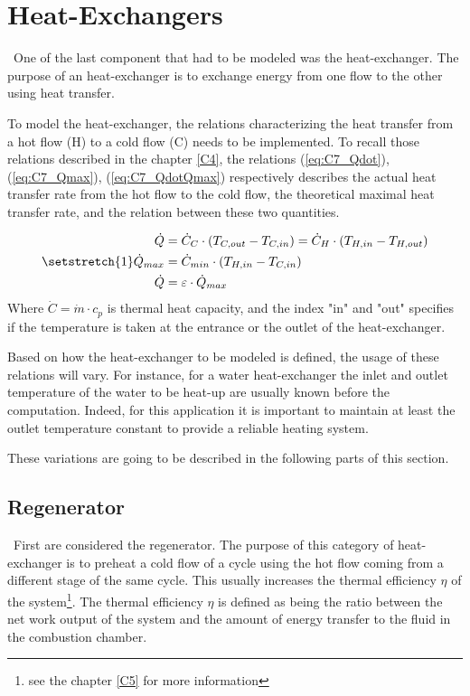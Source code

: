\section{Heat-Exchangers}
\quad\ One of the last component that had to be modeled was the heat-exchanger. The purpose of an heat-exchanger is to exchange energy from one flow to the other using heat transfer. 

To model the heat-exchanger, the relations characterizing the heat transfer from a hot flow (H) to a cold flow (C) needs to be implemented. To recall those relations described in the chapter \ref{C4}, the relations (\ref{eq:C7_Qdot}), (\ref{eq:C7_Qmax}),  (\ref{eq:C7_QdotQmax}) respectively describes the actual heat transfer rate from the hot flow to the cold flow, the theoretical maximal heat transfer rate, and the relation between these two quantities.   

\begin{subequations}
\setstretch{1}
\begin{align}
    \dot{Q} &= \dot{C}_C\cdot (T_{C,out} - T_{C,in}) = \dot{C}_H\cdot(T_{H,in} - T_{H,out})\label{eq:C7_Qdot}\\
    \dot{Q}_{max} &= \dot{C}_{min}\cdot (T_{H,in} - T_{C,in})\label{eq:C7_Qmax}\\
    \dot{Q} &= \varepsilon\cdot\dot{Q}_{max}\label{eq:C7_QdotQmax}
\end{align}
\end{subequations}
Where $\dot{C} = \dot{m}\cdot c_p$ is thermal heat capacity, and the index "in" and "out" specifies if the temperature is taken at the entrance or the outlet of the heat-exchanger. 

Based on how the heat-exchanger to be modeled is defined, the usage of these relations will vary. For instance, for a water heat-exchanger the inlet and outlet temperature of the water to be heat-up are usually known before the computation. Indeed, for this application it is important to maintain at least the outlet temperature constant to provide a reliable heating system. 

These variations are going to be described in the following parts of this section.

\subsection{Regenerator}
\quad\ First are considered the regenerator. The purpose of this category of heat-exchanger is to preheat a cold flow of a cycle using the hot flow coming from a different stage of the same cycle. This usually increases the thermal efficiency $\eta$ of the system\footnote{see the chapter \ref{C5} for more information}. The thermal efficiency $\eta$ is defined as being the ratio between the net work output of the system and the amount of energy transfer to the fluid in the combustion chamber. 

